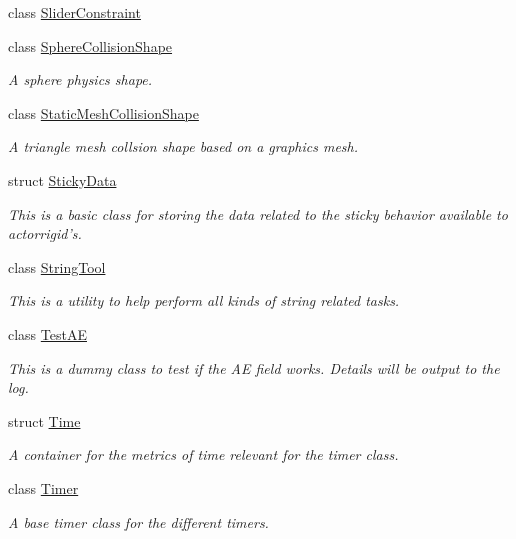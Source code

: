 \begin{DoxyCompactItemize}
class \hyperlink{classMezzanine_1_1SliderConstraint}{SliderConstraint}
\item 
class \hyperlink{classMezzanine_1_1SphereCollisionShape}{SphereCollisionShape}
\begin{DoxyCompactList}\small\item\em A sphere physics shape. \item\end{DoxyCompactList}\item 
class \hyperlink{classMezzanine_1_1StaticMeshCollisionShape}{StaticMeshCollisionShape}
\begin{DoxyCompactList}\small\item\em A triangle mesh collsion shape based on a graphics mesh. \item\end{DoxyCompactList}\item 
struct \hyperlink{structMezzanine_1_1StickyData}{StickyData}
\begin{DoxyCompactList}\small\item\em This is a basic class for storing the data related to the sticky behavior available to actorrigid's. \item\end{DoxyCompactList}\item 
class \hyperlink{classMezzanine_1_1StringTool}{StringTool}
\begin{DoxyCompactList}\small\item\em This is a utility to help perform all kinds of string related tasks. \item\end{DoxyCompactList}\item 
class \hyperlink{classMezzanine_1_1TestAE}{TestAE}
\begin{DoxyCompactList}\small\item\em This is a dummy class to test if the AE field works. Details will be output to the log. \item\end{DoxyCompactList}\item 
struct \hyperlink{structMezzanine_1_1Time}{Time}
\begin{DoxyCompactList}\small\item\em A container for the metrics of time relevant for the timer class. \item\end{DoxyCompactList}\item 
class \hyperlink{classMezzanine_1_1Timer}{Timer}
\begin{DoxyCompactList}\small\item\em A base timer class for the different timers. \item\end{DoxyCompactList}\item 

\end{DoxyCompactItemize}
